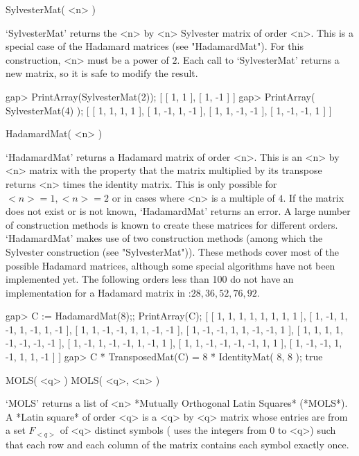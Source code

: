 \>SylvesterMat( <n> )

`SylvesterMat' returns the <n> by <n> Sylvester matrix of order <n>. This
is a special case of the  Hadamard matrices (see "HadamardMat"). For this
construction, <n>  must be  a power of  $2$. Each  call to `SylvesterMat'
returns a new matrix, so it is safe to modify the result.

\beginexample
gap> PrintArray(SylvesterMat(2));
[ [   1,   1 ],
  [   1,  -1 ] ]
gap> PrintArray( SylvesterMat(4) );
[ [   1,   1,   1,   1 ],
  [   1,  -1,   1,  -1 ],
  [   1,   1,  -1,  -1 ],
  [   1,  -1,  -1,   1 ] ] 
\endexample

\>HadamardMat( <n> )

`HadamardMat' returns a Hadamard matrix  of order <n>. This  is an <n> by
<n> matrix with the property that the matrix  multiplied by its transpose
returns <n> times the identity matrix. This is  only possible for $<n>=1,
<n>=2$ or in cases where <n> is a multiple of $4$. If the matrix does not
exist or is not known, `HadamardMat' returns  an error. A large number of
construction methods  is known  to create  these  matrices for  different
orders. `HadamardMat' makes use of  two construction methods (among which
the Sylvester   construction (see "SylvesterMat")).   These methods cover
most of the possible  Hadamard matrices, although some special algorithms
have not been implemented yet. The following orders less  than 100 do not
have an implementation for a Hadamard  matrix in {\GUAVA}:$ 28, 36, 52,
76, 92.$

\beginexample
gap> C := HadamardMat(8);; PrintArray(C);
[ [   1,   1,   1,   1,   1,   1,   1,   1 ],
  [   1,  -1,   1,  -1,   1,  -1,   1,  -1 ],
  [   1,   1,  -1,  -1,   1,   1,  -1,  -1 ],
  [   1,  -1,  -1,   1,   1,  -1,  -1,   1 ],
  [   1,   1,   1,   1,  -1,  -1,  -1,  -1 ],
  [   1,  -1,   1,  -1,  -1,   1,  -1,   1 ],
  [   1,   1,  -1,  -1,  -1,  -1,   1,   1 ],
  [   1,  -1,  -1,   1,  -1,   1,   1,  -1 ] ]
gap> C * TransposedMat(C) = 8 * IdentityMat( 8, 8 );
true 
\endexample

\>MOLS( <q> )
\>MOLS( <q>, <n> )

`MOLS'   returns a   list of  <n>    *Mutually Orthogonal Latin  Squares*
(*MOLS*). A *Latin   square* of order <q> is   a <q> by <q>  matrix whose
entries are from a  set $F_{<q>}$ of <q>  distinct symbols ({\GUAVA} uses
the integers from 0  to <q>) such that each   row and each column  of the
matrix contains each symbol exactly once.

